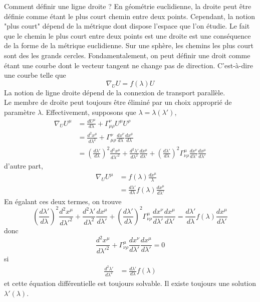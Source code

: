 \documentclass[a4paper,11pt]{report}
\theoremstyle{definition}
\theoremstyle{plain}
\theoremstyle{definition}
\theoremstyle{remark}
\begin{document}
            Comment définir une ligne droite ? En géométrie euclidienne, la droite peut être définie comme étant le plus court chemin entre deux points. Cependant, la notion "plus court" dépend de la métrique dont dispose l'espace que l'on étudie. Le fait que le chemin le plus court entre deux points est une droite est une conséquence de la forme de la métrique euclidienne. Sur une sphère, les chemins les plus court sont des les grands cercles. Fondamentalement, on peut définir une droit comme étant une courbe dont le vecteur tangent ne change pas de direction. C'est-à-dire une courbe telle que
            \begin{equation}
                \nabla_U U = f(\lambda) U
            \end{equation}
            La notion de ligne droite dépend de la connexion de transport parallèle.\\
            
            Le membre de droite peut toujours être éliminé par un choix approprié de paramètre $\lambda$. Effectivement, supposons que $\lambda = \lambda(\lambda')$,
            \begin{align}
                \nabla_U U^\mu &= \frac{dU^\mu}{d\lambda} + \Gamma^\nu_{\mu\rho} U^\mu U^\rho \\
                &= \frac{d^2x^\mu}{d\lambda^2} + \Gamma^\nu_{\mu\rho} \frac{dx^\nu}{d\lambda}\frac{dx^\mu}{d\lambda} \\
                &= \left( \frac{d\lambda'}{d\lambda} \right)^2\frac{d^2x^\mu}{d\lambda'^2}+\frac{d^2\lambda'}{d\lambda^2}\frac{dx^\mu}{d\lambda'}+\left( \frac{d\lambda'}{d\lambda} \right)^2\Gamma^\mu_{\nu\rho} \frac{dx^\nu}{d\lambda'}\frac{dx^\mu}{d\lambda'}
            \end{align}
            d'autre part, 
            \begin{align}
                \nabla_U U^\mu &= f(\lambda) \frac{dx^\mu}{\lambda} \\
                &= \frac{d\lambda'}{d\lambda}f(\lambda)\frac{dx^\mu}{d\lambda'}
            \end{align}
            En égalant ces deux termes, on trouve
            \begin{equation}
                \left( \frac{d\lambda'}{d\lambda} \right)^2\frac{d^2x^\mu}{d\lambda'^2}+\frac{d^2\lambda'}{d\lambda^2}\frac{dx^\mu}{d\lambda'}+\left( \frac{d\lambda'}{d\lambda} \right)^2\Gamma^\mu_{\nu\rho} \frac{dx^\nu}{d\lambda'}\frac{dx^\mu}{d\lambda'} = \frac{d\lambda'}{d\lambda}f(\lambda)\frac{dx^\mu}{d\lambda'}
            \end{equation}
            donc
            \begin{equation}
                \frac{d^2x^\mu}{d\lambda'^2} + \Gamma^\mu_{\nu\rho} \frac{dx^\nu}{d\lambda'}\frac{dx^\mu}{d\lambda'} = 0
            \end{equation}
            si 
            \begin{align}
                \frac{d^2\lambda'}{d\lambda^2} &= \frac{d\lambda'}{d\lambda}f(\lambda)
            \end{align}
            et cette équation différentielle est toujours solvable. Il existe toujours une solution $\lambda'(\lambda)$.
            
\end{document}
